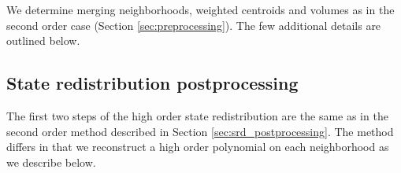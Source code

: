 We determine merging neighborhoods, weighted centroids and volumes as in the second order case (Section \ref{sec:preprocessing}).  The few additional details are outlined below.


\subsection{State redistribution postprocessing} \label{sec:postprocessing_ho}
The first two steps of the high order state redistribution are the same as in the second order method described in Section \ref{sec:srd_postprocessing}.  The method differs in that we reconstruct a high order polynomial on each neighborhood as we describe below.


